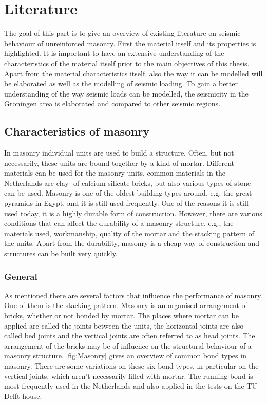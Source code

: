 \chapter{Literature}
\label{ch:literature}

The goal of this part is to give an overview of existing literature on seismic behaviour of unreinforced masonry. First the material itself and its properties is highlighted. It is important to have an extensive understanding of the characteristics of the material itself prior to the main objectives of this thesis. Apart from the material characteristics itself, also the way it can be modelled will be elaborated as well as the modelling of seismic loading. To gain a better understanding of the way seismic loads can be modelled, the seismicity in the Groningen area is elaborated and compared to other seismic regions.

\section{Characteristics of masonry}
\label{sec:characteristics}
In masonry individual units are used to build a structure. Often, but not necessarily, these units are bound together by a kind of mortar. Different materials can be used for the masonry units, common materials in the Netherlands are clay- of calcium silicate bricks, but also various types of stone can be used. Masonry is one of the oldest building types around, e.g. the great pyramids in Egypt, and it is still used frequently. One of the reasons it is still used today, it is a highly durable form of construction. However, there are various conditions that can affect the durability of a masonry structure, e.g., the materials used, workmanship, quality of the mortar and the stacking pattern of the units. Apart from the durability, masonry is a cheap way of construction and structures can be built very quickly.
\subsection{General}
\label{subsec:general}
As mentioned there are several factors that influence the performance of masonry. One of them is the stacking pattern. Masonry is an organised arrangement of bricks, whether or not bonded by mortar. The places where mortar can be applied are called the joints between the units, the horizontal joints are also called bed joints and the vertical joints are often referred to as head joints. The arrangement of the bricks may be of influence on the structural behaviour of a masonry structure. \autoref{fig:Masonry} gives an overview of common bond types in masonry. There are some variations on these six bond types, in particular on the vertical joints, which aren't necessarily filled with mortar. The running bond is most frequently used in the Netherlands and also applied in the tests on the TU Delft house.\\


